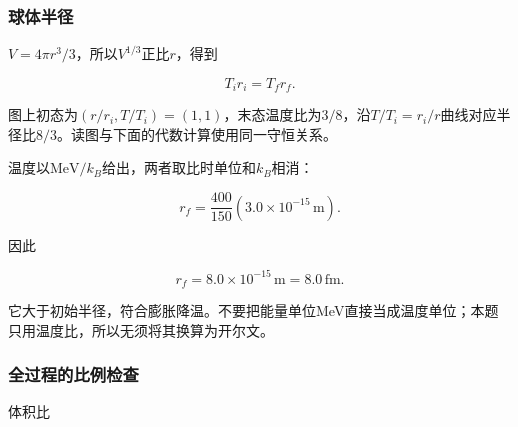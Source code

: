 \documentclass[12pt,a4paper,fontset=fandol]{ctexart}
\begin{document}
\subsubsection{球体半径}\label{ux7403ux4f53ux534aux5f84}

\(V=4\pi r^3/3\)，所以\(V^{1/3}\)正比\(r\)，得到

\[
T_ir_i=T_fr_f.
\]

\begin{center}
\begin{minipage}{\linewidth}
\centering\begingroup{}
\ifdim\wd\diagrambox>.88\linewidth
\sbox{\diagrambox}{\resizebox{.88\linewidth}{!}{\usebox{\diagrambox}}}\fi
\ifdim\ht\diagrambox>.38\textheight
\resizebox{!}{.38\textheight}{\usebox{\diagrambox}}
\else\usebox{\diagrambox}\fi
\par{}\endgroup\end{minipage}\end{center}

图上初态为\((r/r_i,T/T_i)=(1,1)\)，末态温度比为\(3/8\)，沿\(T/T_i=r_i/r\)曲线对应半径比\(8/3\)。读图与下面的代数计算使用同一守恒关系。

温度以\(\mathrm{MeV}/k_B\)给出，两者取比时单位和\(k_B\)相消：

\[
r_f=\frac{400}{150}
\left(3.0\times10^{-15}\,\mathrm m\right).
\]

因此

\[
\boxed{r_f=8.0\times10^{-15}\,\mathrm m=8.0\,\mathrm{fm}}.
\]

它大于初始半径，符合膨胀降温。不要把能量单位MeV直接当成温度单位；本题只用温度比，所以无须将其换算为开尔文。

\subsubsection{全过程的比例检查}\label{ux5168ux8fc7ux7a0bux7684ux6bd4ux4f8bux68c0ux67e5}

体积比
\end{document}
